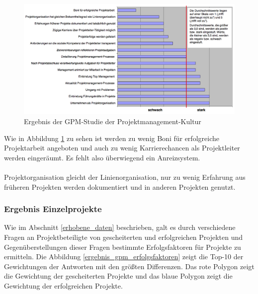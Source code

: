 \documentclass[12pt]{scrartcl}
\begin{document}
\begin{figure}[H]
	\begin{center}
		\includegraphics[width=1.0\textwidth]{img/ergebnis_gpm_studie_kultur}
		\caption{Ergebnis der GPM-Studie der Projektmanagement-Kultur}
		\label{erfgebnis_gpm_studie_pmk}	
	\end{center}
\end{figure}

Wie in Abbildung \ref{erfgebnis_gpm_studie_pmk} zu sehen ist werden zu wenig Boni für erfolgreiche Projektarbeit angeboten und auch zu wenig Karrierechancen als Projektleiter werden eingeräumt. Es fehlt also überwiegend ein Anreizsystem.\\
\\ 
Projektorganisation gleicht der Linienorganisation, nur zu wenig Erfahrung aus früheren Projekten werden dokumentiert und in anderen Projekten genutzt.

\subsubsection{Ergebnis Einzelprojekte}
\label{ergebnis_einzel}

Wie im Abschnitt \ref{erhobene_daten} beschrieben, galt es durch verschiedene Fragen an Projektbeteiligte von gescheiterten und erfolgreichen Projekten und Gegenüberstellungen dieser Fragen bestimmte Erfolgsfaktoren für Projekte zu ermitteln. Die Abbildung \ref{ergebnis_gpm_erfolgsfaktoren} zeigt die Top-10 der Gewichtungen der Antworten mit den größten Differenzen. Das rote Polygon zeigt die Gewichtung der gescheiterten Projekte und das blaue Polygon zeigt die Gewichtung der erfolgreichen Projekte. 
\end{document}
